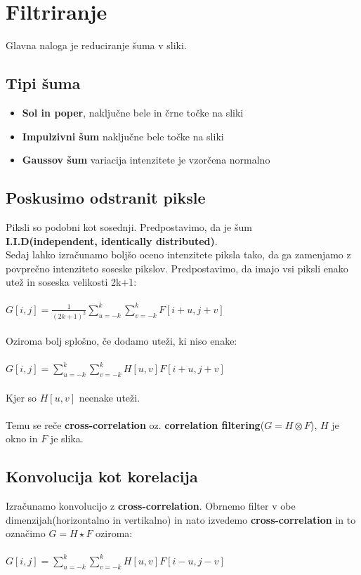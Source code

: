 \documentclass[11pt]{article}
\begin{document}
\newpage

\section{Filtriranje}
Glavna naloga je reduciranje \v{s}uma v sliki.

\subsection{Tipi \v{s}uma}
\begin{itemize}
\item \textbf{Sol in poper}, naklju\v{c}ne bele in \v{c}rne to\v{c}ke na sliki
\item \textbf{Impulzivni \v{s}um} naklju\v{c}ne bele to\v{c}ke na sliki
\item \textbf{Gaussov \v{s}um} variacija intenzitete je vzor\v{c}ena normalno
\end{itemize}

\subsection{Poskusimo odstranit piksle}
Piksli so podobni kot sosednji. Predpostavimo, da je \v{s}um \\ 
\textbf{I.I.D(independent, identically distributed)}. \\
Sedaj lahko izra\v{c}unamo bolj\v{s}o oceno intenzitete piksla tako, da ga zamenjamo z povpre\v{c}no intenziteto soseske pikslov. Predpostavimo, da imajo vsi piksli enako ute\v{z} in soseska velikosti 2k+1: \\
\\
\indent $G[i, j] = \frac{1}{(2k+1)^2}\sum\limits_{u=-k}^k\sum\limits_{v=-k}^kF[i+u, j+v]$ \\
\\
Oziroma bolj splo\v{s}no, \v{c}e dodamo ute\v{z}i, ki niso enake: \\
\\
\indent $G[i, j] = \sum\limits_{u=-k}^k\sum\limits_{v=-k}^kH[u, v]F[i+u, j+v]$ \\
\\
Kjer so $H[u, v]$ neenake ute\v{z}i. \\
\\
Temu se re\v{c}e \textbf{cross-correlation} oz. \textbf{correlation filtering}($G = H \otimes F$), $H$ je okno in $F$ je slika.

\subsection{Konvolucija kot korelacija}
Izra\v{c}unamo konvolucijo z \textbf{cross-correlation}. Obrnemo filter v obe dimenzijah(horizontalno in vertikalno) in nato izvedemo \textbf{cross-correlation} in to ozna\v{c}imo $G = H \star F$ oziroma: \\
\\
\indent $G[i, j] = \sum\limits_{u=-k}^k\sum\limits_{v=-k}^kH[u, v]F[i-u, j-v]$
\end{document}
